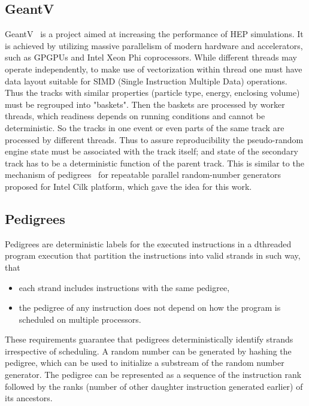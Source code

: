 \documentclass[a4paper, titlepage, 12pt]{article} %
\begin{document}
  \subsection{GeantV}
   GeantV~\cite{1742-6596-523-1-012004} is a project aimed at increasing the performance of HEP simulations.
   It is achieved by utilizing massive parallelism of modern hardware and accelerators, such as GPGPUs and Intel Xeon Phi coprocessors.
   While different threads may operate independently, to make use of vectorization within thread one must have data layout suitable for SIMD (Single Instruction Multiple Data) operations.
   Thus the tracks with similar properties (particle type, energy, enclosing volume) must be regrouped into "baskets".
   Then the baskets are processed by worker threads, which readiness depends on running conditions and cannot be deterministic.
   So the tracks in one event or even parts of the same track are processed by different threads.
   Thus to assure reproducibility the pseudo-random engine state must be associated with the track itself;
   and state of the secondary track has to be a deterministic function of the parent track.
   This is similar to the mechanism of pedigrees~\cite{Leiserson:2012:DPR:2145816.2145841, Leiserson:2012:DPR:2370036.2145841} for repeatable parallel random-number generators proposed for Intel Cilk platform, which gave the idea for this work.
   
  \subsection{Pedigrees}
   Pedigrees are deterministic labels for the executed instructions in a dthreaded program execution that partition the instructions into valid strands in such way, that
   \begin{itemize}
    \item each strand includes instructions with the same pedigree,
    \item the pedigree of any instruction does not depend on how the program is scheduled on multiple processors.
   \end{itemize}
   These requirements guarantee that pedigrees deterministically identify strands irrespective of scheduling.
   A random number can be generated by hashing the pedigree, which can be used to initialize a substream of the random number generator.
   The pedigree can be represented as a sequence of the instruction rank followed by the ranks (number of other daughter instruction generated earlier) of its ancestors.
   
\end{document}
